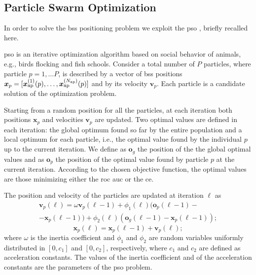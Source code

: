 \documentclass[conference]{IEEEtran}
\begin{document}
\subsection{Particle Swarm Optimization}

In order to solve the \acp{bs} positioning problem we exploit the \ac{pso} \cite{Kennedy-11}, briefly recalled here.
 
\ac{pso} is an iterative optimization algorithm based on social behavior of animals, e.g., birds flocking and fish schools. Consider a total number of $P$ particles, where  particle $p=1, \ldots P$, is described by a vector of \acp{bs} positions $\bm{x}_p = [\bm{x}_{\rm ap}^{(1)}(p),\ldots, \bm{x}_{\rm ap}^{(N_{\rm ap})}(p)]$ and by its velocity $\bm{v}_p$.  Each particle is a candidate solution of the optimization problem. 

Starting from a random position for all the particles, at each iteration both  positions $\bm{x}_p$ and  velocities $\bm{v}_p$ are updated. Two optimal values are defined in each iteration: the global optimum found so far by the entire population and a local optimum for each particle, i.e., the optimal value found by the individual $p$ up to the current iteration. We define as $\bm{o}_g$ the position of the the global optimal values and as $\bm{o}_p$ the position of the optimal value found by particle $p$ at the current iteration. According to the chosen objective function, the optimal values are those minimizing either the \ac{roc} \ac{auc} or  the \ac{ce}.

The position and velocity of the particles are updated at iteration $\ell$ as \cite{Kennedy-11}
   \begin{equation}\label{eq: v up}
\begin{split}
  \bm{v}_p(\ell) = \omega \bm{v}_p(\ell-1)+\phi_1(\ell)(\bm{o}_p(\ell-1)-\\
  -\bm{x}_p(\ell-1))+\phi_2(\ell)(\bm{o}_g(\ell-1)-\bm{x}_p(\ell-1));
  \end{split}
  \end{equation}
  \begin{equation}\label{eq: p up}
  \bm{x}_p(\ell) = \bm{x}_p(\ell-1) + \bm{v}_p(\ell);
 \end{equation}
where $\omega$ is the inertia coefficient and $\phi_1$ and $\phi_2$ are random variables uniformly distributed in $[0,c_1]$ and $[0,c_2]$, respectively, where $c_1$ and $c_2$ are defined as acceleration constants. The values of the inertia coefficient and of the acceleration constants are the parameters of the \ac{pso} problem.
\end{document}
